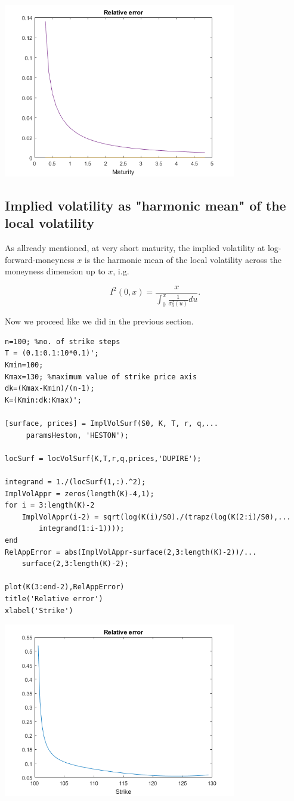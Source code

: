 \includegraphics [width=4in]{fig/ScriptM_05.png}


\subsection{Implied volatility as "harmonic mean" of the local volatility}

\begin{par}
As allready mentioned, at very short maturity, the implied volatility at log-forward-moneyness $x$ is the harmonic mean of the local volatility across the moneyness dimension up to $x$, i.g.
\end{par} \vspace{1em}
\begin{par}
$$I^2(0,x) = \frac{x}{\int_0^x\frac{1}{\sigma_0^2(u)}du}.$$
\end{par} \vspace{1em}
\begin{par}
Now we proceed like we did in the previous section.
\end{par} \vspace{1em}
\begin{verbatim}
n=100; %no. of strike steps
T = (0.1:0.1:10*0.1)';
Kmin=100;
Kmax=130; %maximum value of strike price axis
dk=(Kmax-Kmin)/(n-1);
K=(Kmin:dk:Kmax)';

[surface, prices] = ImplVolSurf(S0, K, T, r, q,...
	 paramsHeston, 'HESTON');

locSurf = locVolSurf(K,T,r,q,prices,'DUPIRE');

integrand = 1./(locSurf(1,:).^2);
ImplVolAppr = zeros(length(K)-4,1);
for i = 3:length(K)-2
    ImplVolAppr(i-2) = sqrt(log(K(i)/S0)./(trapz(log(K(2:i)/S0),...
    	integrand(1:i-1))));
end
RelAppError = abs(ImplVolAppr-surface(2,3:length(K)-2))/...
	surface(2,3:length(K)-2);

plot(K(3:end-2),RelAppError)
title('Relative error')
xlabel('Strike')
\end{verbatim}

\includegraphics [width=4in]{fig/ScriptM_06.png}